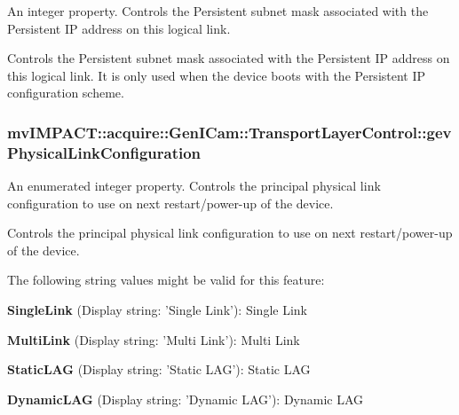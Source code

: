 An integer property. Controls the Persistent subnet mask associated with the Persistent I\+P address on this logical link. 

Controls the Persistent subnet mask associated with the Persistent I\+P address on this logical link. It is only used when the device boots with the Persistent I\+P configuration scheme. \hypertarget{classmv_i_m_p_a_c_t_1_1acquire_1_1_gen_i_cam_1_1_transport_layer_control_a1d04272869b5fb01e6d619dd98cfddd0}{
\subsubsection[{gev\+Physical\+Link\+Configuration}]{ mv\+I\+M\+P\+A\+C\+T\+::acquire\+::\+Gen\+I\+Cam\+::\+Transport\+Layer\+Control\+::gev\+Physical\+Link\+Configuration}}\label{classmv_i_m_p_a_c_t_1_1acquire_1_1_gen_i_cam_1_1_transport_layer_control_a1d04272869b5fb01e6d619dd98cfddd0}


An enumerated integer property. Controls the principal physical link configuration to use on next restart/power-\/up of the device. 

Controls the principal physical link configuration to use on next restart/power-\/up of the device.

The following string values might be valid for this feature\+:
\begin{DoxyItemize}
\item {\bfseries Single\+Link} (Display string\+: 'Single Link')\+: Single Link
\item {\bfseries Multi\+Link} (Display string\+: 'Multi Link')\+: Multi Link
\item {\bfseries Static\+L\+A\+G} (Display string\+: 'Static L\+A\+G')\+: Static L\+A\+G
\item {\bfseries Dynamic\+L\+A\+G} (Display string\+: 'Dynamic L\+A\+G')\+: Dynamic L\+A\+G
\end{DoxyItemize}

